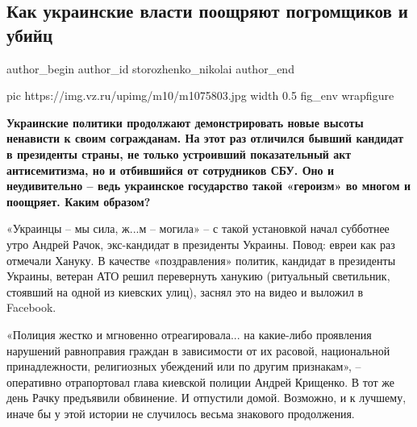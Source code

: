  
 
 
 
 
 
\subsection{Как украинские власти поощряют погромщиков и убийц}
\label{sec:15_12_2020.news.ru.vz.storozhenko_nikolai.1.ukraina_vlasti_nazis}
\ifcmt
	author_begin
   author_id storozhenko_nikolai
	author_end
\fi


\ifcmt
  pic https://img.vz.ru/upimg/m10/m1075803.jpg
  width 0.5
  fig_env wrapfigure
\fi

\textbf{Украинские политики продолжают демонстрировать новые высоты ненависти к своим
согражданам. На этот раз отличился бывший кандидат в президенты страны, не
только устроивший показательный акт антисемитизма, но и отбившийся от
сотрудников СБУ. Оно и неудивительно – ведь украинское государство такой
«героизм» во многом и поощряет. Каким образом?}


«Украинцы – мы сила, ж...м – могила» – с такой установкой начал субботнее утро
Андрей Рачок, экс-кандидат в президенты Украины. Повод: евреи как раз отмечали
Хануку. В качестве «поздравления» политик, кандидат в президенты Украины,
ветеран АТО решил перевернуть ханукию (ритуальный светильник, стоявший на одной
из киевских улиц), заснял это на видео и выложил в Facebook.

«Полиция жестко и мгновенно отреагировала... на какие-либо проявления нарушений
равноправия граждан в зависимости от их расовой, национальной принадлежности,
религиозных убеждений или по другим признакам», – оперативно отрапортовал глава
киевской полиции Андрей Крищенко. В тот же день Рачку предъявили обвинение. И
отпустили домой. Возможно, и к лучшему, иначе бы у этой истории не случилось
весьма знакового продолжения.

